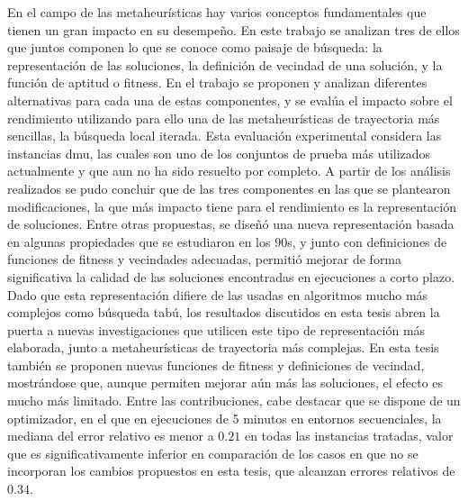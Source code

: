 En el campo de las metaheurísticas hay varios conceptos fundamentales que tienen un gran impacto en su desempeño.
%
En este trabajo se analizan tres de ellos que juntos componen lo que se conoce como paisaje de búsqueda: la representación de las soluciones, 
la definición de vecindad de una solución, y la función de aptitud o fitness. 
%
En el trabajo se proponen y analizan diferentes alternativas para cada una de estas componentes, y se evalúa el impacto sobre el rendimiento utilizando
para ello una de las metaheurísticas de trayectoria más sencillas, la búsqueda local iterada.
%
Esta evaluación experimental considera las instancias dmu, las cuales son uno de los conjuntos de prueba más utilizados actualmente y que aun no ha
sido resuelto por completo.
%
A partir de los análisis realizados se pudo concluir que de las tres componentes en las que se plantearon modificaciones, la que más impacto tiene para el
rendimiento es la representación de soluciones.
%
Entre otras propuestas, se diseñó una nueva representación basada en algunas propiedades que se estudiaron en los 90s, y junto con definiciones
de funciones de fitness y vecindades adecuadas, permitió mejorar de forma significativa la calidad de las soluciones encontradas en ejecuciones a corto plazo. 
%
Dado que esta representación difiere de las usadas en algoritmos mucho más complejos como búsqueda tabú, los resultados discutidos en esta tesis
abren la puerta a nuevas investigaciones que utilicen este tipo de representación más elaborada, junto a metaheurísticas de
trayectoria más complejas.
%
En esta tesis también se proponen nuevas funciones de fitness y definiciones de vecindad, mostrándose que, aunque permiten mejorar aún más las soluciones,
el efecto es mucho más limitado.
%
Entre las contribuciones, cabe destacar que se dispone de un optimizador, en el que en ejecuciones de 5 minutos en entornos secuenciales, 
la mediana del error relativo es menor a $0.21$ en todas las instancias tratadas, valor que es significativamente inferior en comparación de los casos 
en que no se incorporan los cambios propuestos en esta tesis, que alcanzan errores relativos de $0.34$.


\let\cleardoublepage\clearpage



